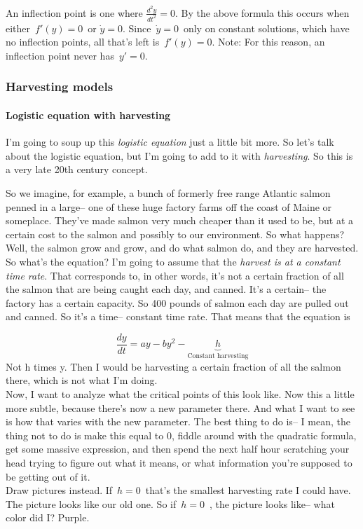 An inflection point is one where $\displaystyle {\frac{d^2y}{dt^2} = 0}$.
By the above formula this occurs when either $\, f'(y)=0 \,$ or $\dot y = 0$.
Since $\, \dot y=0\,$ only on constant solutions,
which have no inflection points, all that's left is $\, f'(y)=0$. 
Note: For this reason, an inflection point never has $\, y'=0$. 

\clearpage

\subsubsection{Harvesting models}

\paragraph{Logistic equation with harvesting}
I'm going to soup up this \emph{logistic equation} just a little bit more.
So let's talk about the logistic equation,
but I'm going to add to it with \emph{harvesting}.
So this is a very late 20th century concept.

So we imagine, for example, a bunch of formerly free range
Atlantic salmon penned in a large--
one of these huge factory farms off the coast of Maine or someplace.
They've made salmon very much cheaper than it used to be,
but at a certain cost to the salmon and possibly to our environment.
So what happens?
Well, the salmon grow and grow, and do what salmon do, and they
are harvested. \\
So what's the equation?
I'm going to assume that the \emph{harvest is at a constant time rate}.
That corresponds to, in other words,
it's not a certain fraction of all the salmon that are being
caught each day, and canned.
It's a certain-- the factory has a certain capacity.
So 400 pounds of salmon each day are pulled out and canned.
So it's a time-- constant time rate.
That means that the equation is

\begin{equation*}
  \frac{dy}{dt} = ay - by^2 - \underbrace{h}_{\text{Constant harvesting}}
\end{equation*}
Not h times y.
Then I would be harvesting a certain fraction
of all the salmon there, which is not what I'm doing. \\
Now, I want to analyze what the critical points of this look
like.
Now this a little more subtle, because there's now
a new parameter there.
And what I want to see is how that
varies with the new parameter.
The best thing to do is--
I mean, the thing not to do is make this equal to $0$,
fiddle around with the quadratic formula,
get some massive expression, and then spend the next half
hour scratching your head trying to figure out what it means,
or what information you're supposed to be getting out of it.\\
Draw pictures instead.
If $\, h = 0 \,$ that's the smallest harvesting rate I could have.
The picture looks like our old one.
So if $\,h = 0\,$ , the picture looks like--
what color did I? Purple.

